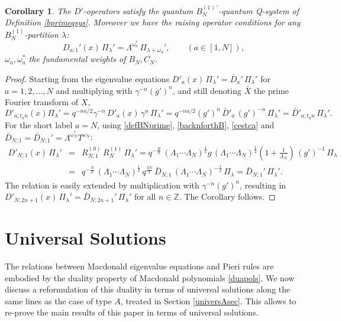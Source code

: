 \documentclass[12pt]{amsart}
\newtheorem{cor}[thm]{Corollary}
\newcommand{\barD}{\bar D}
\newcommand{\Z}{{\mathbb Z}}
\newcommand{\lL}{{\Lambda}}
\newcommand{\half}{\frac{1}{2}}
\numberwithin{equation}{section}
\begin{document}
%
%

\begin{cor}
The $D'$-operators satisfy the quantum $B_N^{(1)\,'}$-quantum Q-system of Definition \ref{bprimeqsys}. Moreover we have the raising
operator conditions for any $B_N^{(1)}$-partition $\lambda$:
$$ D_{a;1}'(x)\,\Pi_\lambda'= \lL^{\omega_a^*}\, \Pi_{\lambda+\omega_a}', \qquad (a\in [1,N]),
$$
$\omega_a,\omega_a^*$ the fundamental weights of $B_N,C_N$.
\end{cor}
\begin{proof}
Starting from the eigenvalue equations
$D'_{a}(x)\, \Pi_\lambda'=\barD_{a}'\, \Pi_\lambda'$ for $a=1,2,...,N$ and 
multiplying with $\gamma^{-n}(g')^n$, and still denoting $\bar X$ the prime Fourier transform of $X$,
$$ D'_{a;t_a n}(x) \Pi_\lambda'=q^{-na/2} \gamma^{-n}\,D'_{a}(x)\,\gamma^n \,\Pi_\lambda'=
q^{-na/2} (g')^n\,\barD'_{a}\,(g')^{-n} \,\Pi_\lambda'=\barD'_{a;t_a n}\, \Pi _\lambda'.$$
%
For the short label $a=N$, using \eqref{defBNprime},  \eqref{backnforthB}, \eqref{cestca} and $\barD_{N;1}=\barD_{N;1}'=\lL^{\omega_N^*}T^{\omega_N}$:
\begin{eqnarray*}
D'_{N;1}(x)\,\Pi _\lambda' &=&R_{N;1}^{(0)}\, R_{N}^{(1)}\, \Pi _\lambda' =q^{-\frac{N}{8}}\,(\lL_1\cdots \lL_N)^{\half}g\, (\lL_1\cdots \lL_N)^\half \left(1+\frac{1}{\lL_N}\right) \,(g')^{-1}\, \Pi_\lambda
%
%
\\
&=&q^{-\frac{N}{8}}\, (\lL_1\cdots \lL_N)^{\half} \,q^{\frac{3N}{8}}\,\bar D_{N;1}\,(\lL_1\cdots \lL_N)^{-\half}\,\Pi_\lambda
%
%
%
%
%
=\barD_{N;1}'\,\Pi_\lambda'.
\end{eqnarray*}
%
The relation is easily extended by multiplication with 
$\gamma^{-n}(g')^n$, resulting in $D'_{N;2n+1}(x)\,\Pi _\lambda' =\barD_{N;2n+1}'\,\Pi_\lambda'$ for all $n\in \Z$. 
The Corollary follows.

\end{proof}









\section{Universal Solutions}
\label{sec:universal}


The relations between Macdonald eigenvalue equations and Pieri rules are embodied by the duality property of Macdonald polynomials \eqref{duapols}.
We now discuss a reformulation of this duality in terms of universal solutions along the same lines as the case of type $A$,
treated in Section \ref{universAsec}. This allows to re-prove the main results of this paper in terms of universal solutions.
\end{document}
